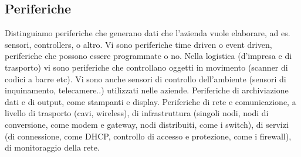 \subsection{Periferiche}
Distinguiamo periferiche che generano dati che l'azienda vuole elaborare, ad es. sensori, controllers, o altro.
Vi sono periferiche time driven o event driven, periferiche che possono essere programmate o no.
Nella logistica (d'impresa e di trasporto) vi sono periferiche che controllano oggetti in movimento (scanner di codici a barre etc).
Vi sono anche sensori di controllo dell'ambiente (sensori di inquinamento, telecamere..) utilizzati nelle aziende. 
Periferiche di archiviazione dati e di output, come stampanti e display. 
Periferiche di rete e comunicazione, a livello di trasporto (cavi, wireless), di infrastruttura (singoli nodi, nodi di conversione, come modem e gateway, nodi distribuiti, come i switch), di servizi (di connessione, come DHCP, controllo di accesso e protezione, come i firewall), di monitoraggio della rete.